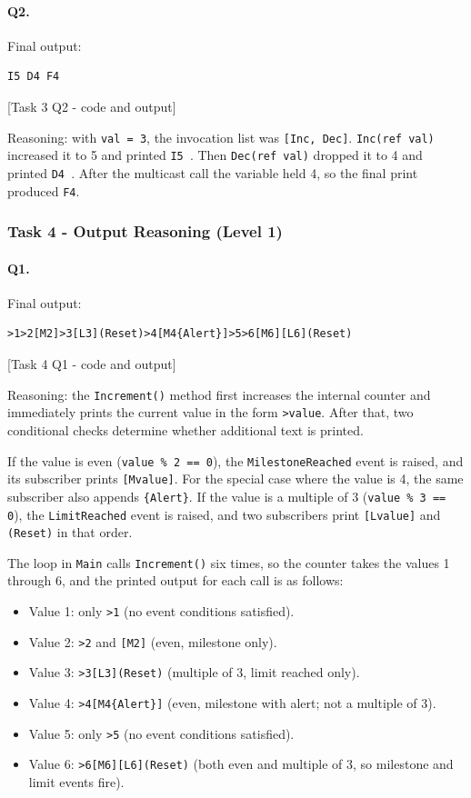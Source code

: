 \paragraph{Q2.} Final output: 
\begin{lstlisting}
I5 D4 F4
\end{lstlisting}

[Task 3 Q2 - code and output]

Reasoning: with \texttt{val = 3}, the invocation list was \texttt{[Inc, Dec]}. \texttt{Inc(ref val)} increased it to 5 and printed \texttt{I5 }. Then \texttt{Dec(ref val)} dropped it to 4 and printed \texttt{D4 }. After the multicast call the variable held 4, so the final print produced \texttt{F4}.

\newpage

\subsubsection{Task 4 - Output Reasoning (Level 1)}

\paragraph{Q1.} Final output:
\begin{lstlisting}
>1>2[M2]>3[L3](Reset)>4[M4{Alert}]>5>6[M6][L6](Reset)
\end{lstlisting}

[Task 4 Q1 - code and output]

Reasoning: the \texttt{Increment()} method first increases the internal counter and immediately prints the current value in the form \texttt{>value}. After that, two conditional checks determine whether additional text is printed.

If the value is even (\texttt{value \% 2 == 0}), the \texttt{MilestoneReached} event is raised, and its subscriber prints \texttt{[Mvalue]}. For the special case where the value is 4, the same subscriber also appends \texttt{\{Alert\}}. If the value is a multiple of 3 (\texttt{value \% 3 == 0}), the \texttt{LimitReached} event is raised, and two subscribers print \texttt{[Lvalue]} and \texttt{(Reset)} in that order.

The loop in \texttt{Main} calls \texttt{Increment()} six times, so the counter takes the values 1 through 6, and the printed output for each call is as follows:
\begin{itemize}[itemsep=0pt]
	\item Value 1: only \texttt{>1} (no event conditions satisfied).
	\item Value 2: \texttt{>2} and \texttt{[M2]} (even, milestone only).
	\item Value 3: \texttt{>3[L3](Reset)} (multiple of 3, limit reached only).
	\item Value 4: \texttt{>4[M4\{Alert\}]} (even, milestone with alert; not a multiple of 3).
	\item Value 5: only \texttt{>5} (no event conditions satisfied).
	\item Value 6: \texttt{>6[M6][L6](Reset)} (both even and multiple of 3, so milestone and limit events fire).
\end{itemize}

